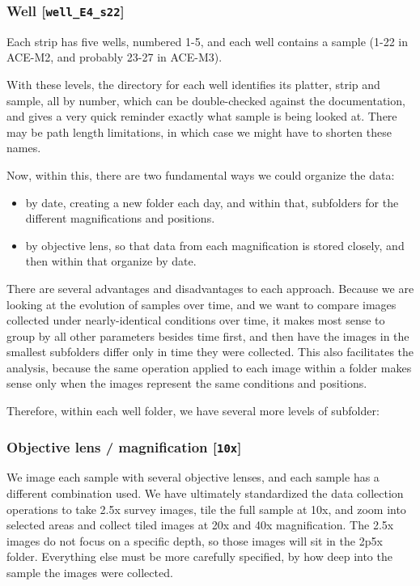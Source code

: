 \subsubsection{Well [{\tt well\_E4\_s22}]}\hypertarget{well-welle4s22}{}\label{well-welle4s22}
Each strip has five wells, numbered 1-5, and each well contains a sample (1-22
in ACE-M2, and probably 23-27 in ACE-M3).

With these levels, the directory for each well identifies its platter, strip and
sample, all by number, which can be double-checked against the documentation,
and gives a very quick reminder exactly what sample is being looked at. There
may be path length limitations, in which case we might have to shorten these
names.

Now, within this, there are two fundamental ways we could organize the data:

\begin{itemize}
\item by date, creating a new folder each day, and within that, subfolders for the different magnifications and positions.
\item by objective lens, so that data from each magnification is stored closely, and then within that organize by date.
\end{itemize}

There are several advantages and disadvantages to each approach. Because we are
looking at the evolution of samples over time, and we want to compare images
collected under nearly-identical conditions over time, it makes most sense to
group by all other parameters besides time first, and then have the images in
the smallest subfolders differ only in time they were collected. This also
facilitates the analysis, because the same operation applied to each image
within a folder makes sense only when the images represent the same conditions
and positions.

Therefore, within each well folder, we have several more levels of subfolder:

\subsubsection{Objective lens / magnification [{\tt 10x}]}\hypertarget{objective-lens--magnification-10x}{}\label{objective-lens--magnification-10x}
We image each sample with several objective lenses, and each sample has a
different combination used. We have ultimately standardized the data collection operations to take 2.5x
survey images, tile the full sample at 10x, and zoom into selected areas and
collect tiled images at 20x and 40x magnification. The 2.5x images do not focus
on a specific depth, so those images will sit in the 2p5x folder. Everything
else must be more carefully specified, by how deep into the sample the images
were collected.

